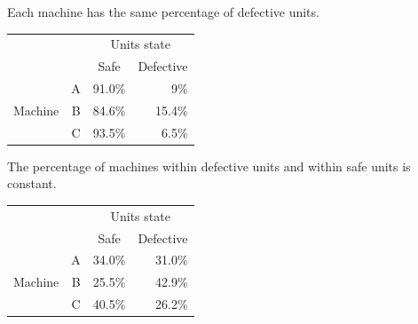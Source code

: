 \begin{frame}
  \begin{footnotesize}
    Each machine has the same percentage of defective units.\\
  \end{footnotesize}
  \begin{table}
    \begin{tabular}{|c|c|r|r|}
      \cline{3-4}
       \multicolumn{2}{c}{} & \multicolumn{2}{|c|}{Units state}\\ \cline{3-4}
      \multicolumn{2}{c}{} & \multicolumn{1}{|c|}{\hspace*{.25cm}Safe\hspace*{.25cm}} & \multicolumn{1}{|c|}{Defective}\\ \hline
      & \multicolumn{1}{|c|}{\hspace*{.5cm}A\hspace*{.5cm}} & \multicolumn{1}{|r|}{91.0\%} & \multicolumn{1}{|r|}{9\%}\\ \cline{2-4}
      \multicolumn{1}{|c|}{Machine} & \multicolumn{1}{|c|}{B} & \multicolumn{1}{|r|}{84.6\%} & \multicolumn{1}{|r|}{15.4\%}\\ \cline{2-4}
      & \multicolumn{1}{|c|}{C} & \multicolumn{1}{|r|}{93.5\%} & \multicolumn{1}{|r|}{6.5\%}\\ \hline
    \end{tabular}
  \end{table} 
  \vspace*{.5cm}
  \begin{footnotesize}
    The percentage of machines within defective units and within safe units is constant.
  \end{footnotesize}
  \begin{table}
    \begin{tabular}{|c|c|r|r|}
      \cline{3-4}
      \multicolumn{2}{c}{} & \multicolumn{2}{|c|}{Units state}\\ \cline{3-4}
      \multicolumn{2}{c}{} & \multicolumn{1}{|c|}{\hspace*{.25cm}Safe\hspace*{.25cm}} & \multicolumn{1}{|c|}{Defective}\\ \hline
      & \multicolumn{1}{|c|}{\hspace*{.5cm}A\hspace*{.5cm}} & \multicolumn{1}{|r|}{34.0\%} & \multicolumn{1}{|r|}{31.0\%}\\ \cline{2-4}
      \multicolumn{1}{|c|}{Machine} & \multicolumn{1}{|c|}{B} & \multicolumn{1}{|r|}{25.5\%} & \multicolumn{1}{|r|}{42.9\%}\\ \cline{2-4}
      & \multicolumn{1}{|c|}{C} & \multicolumn{1}{|r|}{40.5\%} & \multicolumn{1}{|r|}{26.2\%}\\ \hline
    \end{tabular}
  \end{table} 
  \vspace*{.5cm}
\end{frame}

